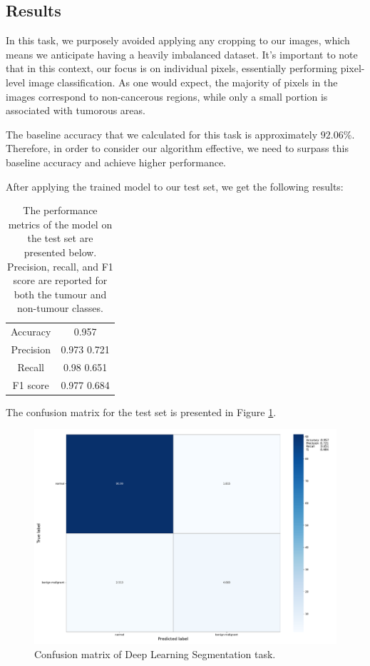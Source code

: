\subsection{Results}
In this task, we purposely avoided applying any cropping to our images, which means we anticipate having a heavily imbalanced dataset. It's important to note that in this context, our focus is on individual pixels, essentially performing pixel-level image classification. As one would expect, the majority of pixels in the images correspond to non-cancerous regions, while only a small portion is associated with tumorous areas.

The baseline accuracy that we calculated for this task is approximately $92.06\%$. Therefore, in order to consider our algorithm effective, we need to surpass this baseline accuracy and achieve higher performance.

After applying the trained model to our test set, we get the following results:
\begin{table}[H]
\centering
\begin{tabular}{cc}
Accuracy  & 0.957        \\
Precision & 0.973 0.721 \\
Recall    & 0.98 0.651 \\
F1 score  & 0.977 0.684
\end{tabular}
\caption{The performance metrics of the model on the test set are presented below. Precision, recall, and F1 score are reported for both the tumour and non-tumour classes.}
\label{Table - DL_Segmentation Test accuracy-precision-recall-f1 results for model}
\end{table}

The confusion matrix for the test set is presented in Figure \ref{Figure - DL_Segmentation Confusion matrix}.
\begin{figure}
  \includegraphics[width=\linewidth]{Figures/Confusion_Matrix_DL_Segmentation.pdf}
  \caption{Confusion matrix of Deep Learning Segmentation task.}
  \label{Figure - DL_Segmentation Confusion matrix}
\end{figure}

